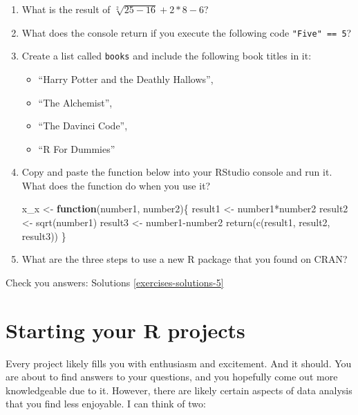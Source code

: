 \documentclass[
]{book}
\newenvironment{Shaded}{\begin{snugshade}}{\end{snugshade}}
\newcommand{\ControlFlowTok}[1]{\textcolor[rgb]{0.13,0.29,0.53}{\textbf{#1}}}
\newcommand{\FunctionTok}[1]{\textcolor[rgb]{0.00,0.00,0.00}{#1}}
\newcommand{\NormalTok}[1]{#1}
\newcommand{\OtherTok}[1]{\textcolor[rgb]{0.56,0.35,0.01}{#1}}
\newcommand{\SpecialCharTok}[1]{\textcolor[rgb]{0.00,0.00,0.00}{#1}}
\begin{document}
\begin{enumerate}
\def\labelenumi{\arabic{enumi}.}
\item
  What is the result of \(\sqrt[2]{25-16}+2*8-6\)?
\item
  What does the console return if you execute the following code \texttt{"Five"\ ==\ 5}?
\item
  Create a list called \texttt{books} and include the following book titles in it:

  \begin{itemize}
  \item
    ``Harry Potter and the Deathly Hallows'',
  \item
    ``The Alchemist'',
  \item
    ``The Davinci Code'',
  \item
    ``R For Dummies''
  \end{itemize}
\item
  Copy and paste the function below into your RStudio console and run it. What does the function do when you use it?

\begin{Shaded}
\begin{Highlighting}[]

\NormalTok{x\_x }\OtherTok{\textless{}{-}} \ControlFlowTok{function}\NormalTok{(number1, number2)\{}
\NormalTok{  result1 }\OtherTok{\textless{}{-}}\NormalTok{ number1}\SpecialCharTok{*}\NormalTok{number2}
\NormalTok{  result2 }\OtherTok{\textless{}{-}} \FunctionTok{sqrt}\NormalTok{(number1)}
\NormalTok{  result3 }\OtherTok{\textless{}{-}}\NormalTok{ number1}\SpecialCharTok{{-}}\NormalTok{number2}
  \FunctionTok{return}\NormalTok{(}\FunctionTok{c}\NormalTok{(result1, result2, result3))}
\NormalTok{\} }
\end{Highlighting}
\end{Shaded}
\item
  What are the three steps to use a new R package that you found on CRAN?
\end{enumerate}

Check you answers: Solutions \ref{exercises-solutions-5}

\hypertarget{starting-your-r-projects}{%
\chapter{Starting your R projects}\label{starting-your-r-projects}}

Every project likely fills you with enthusiasm and excitement. And it should. You are about to find answers to your questions, and you hopefully come out more knowledgeable due to it. However, there are likely certain aspects of data analysis that you find less enjoyable. I can think of two:
\end{document}
